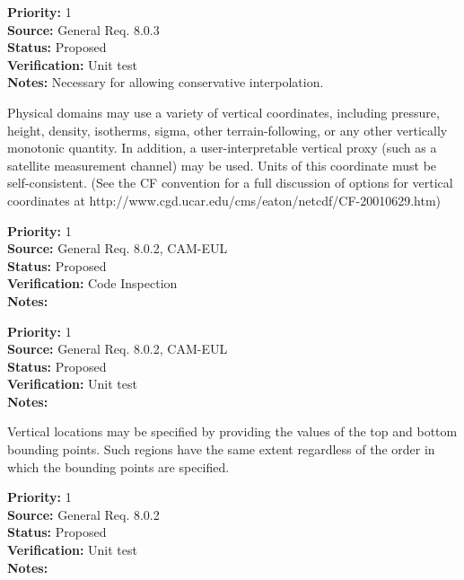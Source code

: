 \begin{reqlist}
{\bf Priority:} 1 \\
{\bf Source:} General Req. 8.0.3 \\
{\bf Status:} Proposed \\
{\bf Verification:} Unit test\\
{\bf Notes:} Necessary for allowing conservative interpolation.
\end{reqlist}



Physical domains may use a variety of vertical coordinates, including pressure,
height, density, isotherms, sigma, other terrain-following, or any other
vertically monotonic quantity.  In addition, a user-interpretable vertical
proxy (such as a satellite measurement channel) may be used.  Units of this
coordinate must be self-consistent.  (See the CF convention for a full
discussion of options for vertical coordinates at
http://www.cgd.ucar.edu/cms/eaton/netcdf/CF-20010629.htm)
\begin{reqlist}
{\bf Priority:} 1 \\
{\bf Source:} General Req. 8.0.2, CAM-EUL \\
{\bf Status:} Proposed \\
{\bf Verification:} Code Inspection\\
{\bf Notes:} 
\end{reqlist}

\begin{reqlist}
{\bf Priority:} 1 \\
{\bf Source:} General Req. 8.0.2, CAM-EUL \\
{\bf Status:} Proposed \\
{\bf Verification:} Unit test\\
{\bf Notes:} 
\end{reqlist}


Vertical locations may be specified by providing the values of the top and
bottom bounding points.  Such regions have the same extent regardless of the
order in which the bounding points are specified.
\begin{reqlist}
{\bf Priority:} 1 \\
{\bf Source:} General Req. 8.0.2 \\
{\bf Status:} Proposed \\
{\bf Verification:} Unit test\\
{\bf Notes:} 
\end{reqlist}

